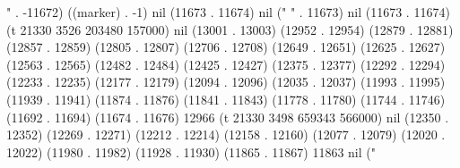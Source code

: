 " . -11672) ((marker) . -1) nil (11673 . 11674) nil (" " . 11673) nil (11673 . 11674) (t 21330 3526 203480 157000) nil (13001 . 13003) (12952 . 12954) (12879 . 12881) (12857 . 12859) (12805 . 12807) (12706 . 12708) (12649 . 12651) (12625 . 12627) (12563 . 12565) (12482 . 12484) (12425 . 12427) (12375 . 12377) (12292 . 12294) (12233 . 12235) (12177 . 12179) (12094 . 12096) (12035 . 12037) (11993 . 11995) (11939 . 11941) (11874 . 11876) (11841 . 11843) (11778 . 11780) (11744 . 11746) (11692 . 11694) (11674 . 11676) 12966 (t 21330 3498 659343 566000) nil (12350 . 12352) (12269 . 12271) (12212 . 12214) (12158 . 12160) (12077 . 12079) (12020 . 12022) (11980 . 11982) (11928 . 11930) (11865 . 11867) 11863 nil ("%